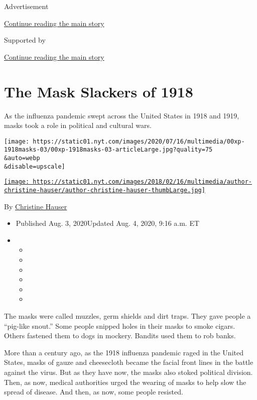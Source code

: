 Advertisement

\protect\hyperlink{after-top}{Continue reading the main story}

Supported by

\protect\hyperlink{after-sponsor}{Continue reading the main story}

\hypertarget{the-mask-slackers-of-1918}{%
\section{The Mask Slackers of 1918}\label{the-mask-slackers-of-1918}}

As the influenza pandemic swept across the United States in 1918 and
1919, masks took a role in political and cultural wars.

\texttt{[image: https://static01.nyt.com/images/2020/07/16/multimedia/00xp-1918masks-03/00xp-1918masks-03-articleLarge.jpg?quality=75\\\&auto=webp\\\&disable=upscale]}

\href{https://www.nytimes.com/by/christine-hauser}{\texttt{[image: https://static01.nyt.com/images/2018/02/16/multimedia/author-christine-hauser/author-christine-hauser-thumbLarge.jpg]}}

By \href{https://www.nytimes.com/by/christine-hauser}{Christine Hauser}

\begin{itemize}
\item
  Published Aug. 3, 2020Updated Aug. 4, 2020, 9:16 a.m. ET
\item
  \begin{itemize}
  \item
  \item
  \item
  \item
  \item
  \item
  \end{itemize}
\end{itemize}

The masks were called muzzles, germ shields and dirt traps. They gave
people a ``pig-like snout.'' Some people snipped holes in their masks to
smoke cigars. Others fastened them to dogs in mockery. Bandits used them
to rob banks.

More than a century ago, as the 1918 influenza pandemic raged in the
United States, masks of gauze and cheesecloth became the facial front
lines in the battle against the virus. But as they have now, the masks
also stoked political division. Then, as now, medical authorities urged
the wearing of masks to help slow the spread of disease. And then, as
now, some people resisted.

